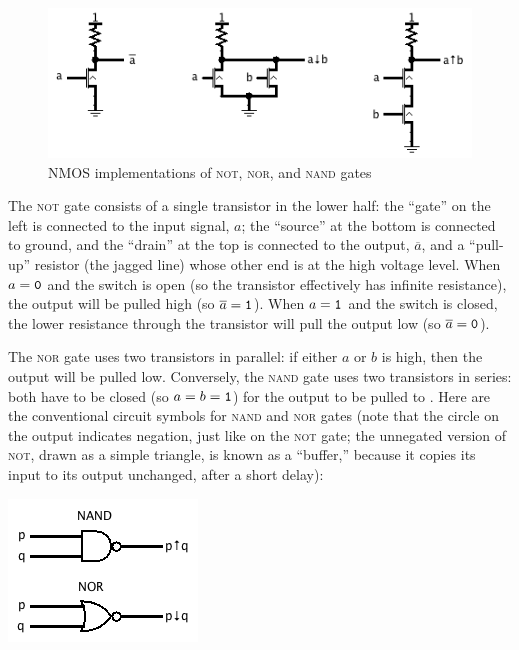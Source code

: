 \begin{figure}
\begin{center}
\includegraphics[width=!,height=!,scale=0.75]{graphics/NMOSgates.png}
\end{center}
\caption{NMOS implementations of \textsc{not}, \textsc{nor}, and \textsc{nand} gates}
\label{fig:nmosgates}
\end{figure}

The \textsc{not} gate consists of a single transistor in the lower half: the ``gate'' on the left is connected to the input signal, $a$; the ``source'' at the bottom is connected to ground, and the ``drain'' at the top is connected to the output, $\overline{a}$, and a ``pull-up'' resistor (the jagged line) whose other end is at the high voltage level. When $a=\mathtt{0}$ and the switch is open (so the transistor effectively has infinite resistance), the output will be pulled high (so $\overline{a}=\mathtt{1}$). When $a=\mathtt{1}$ and the switch is closed, the lower resistance through the transistor will pull the output low (so $\overline{a}=\mathtt{0}$).

The \textsc{nor} gate uses two transistors in parallel: if either $a$ or $b$ is high, then the output will be pulled low. Conversely, the \textsc{nand} gate uses two transistors in series: both have to be closed (so $a=b=\mathtt{1}$) for the output to be pulled to \0. Here are the conventional circuit symbols for \textsc{nand} and \textsc{nor} gates (note that the circle on the output indicates negation, just like on the \textsc{not} gate; the unnegated version of \textsc{not}, drawn as a simple triangle, is known as a ``buffer,'' because it copies its input to its output unchanged, after a short delay):
\begin{center}
\includegraphics[width=!,height=!,scale=0.75]{graphics/NandNor.png}
\end{center}

